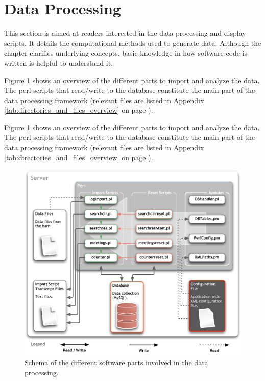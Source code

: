 \newpage
\section{Data Processing}
\label{sec:dataproc}

This section is aimed at readers interested in the data processing and display scripts. It details the computational methods used to generate data. Although the chapter clarifies underlying concepts, basic knowledge in how software code is written is helpful to understand it. 

Figure \ref{fig:app_design_perl} shows an overview of the different parts to import and analyze the data. The \ac{perl} scripts that read/write to the database constitute the main part of the
data processing framework (relevant files are listed in Appendix \ref{tab:directories_and_files_overview} on page \pageref{tab:directories_and_files_overview}). 

Figure \ref{fig:app_design_perl} shows an overview of the different parts to import and analyze the data. The \ac{perl} scripts that read/write to the database constitute the main part of the
data processing framework (relevant files are listed in Appendix \ref{tab:directories_and_files_overview} on page \pageref{tab:directories_and_files_overview}). 

\begin{figure}[htpb]
\begin{center}
  \includegraphics[width=\textwidth]{assets/pdf/app_design_perl.pdf}
  \caption[Schema of data processing]{Schema of the different software parts involved in the data processing.}
  \label{fig:app_design_perl}
\end{center}
\end{figure}

